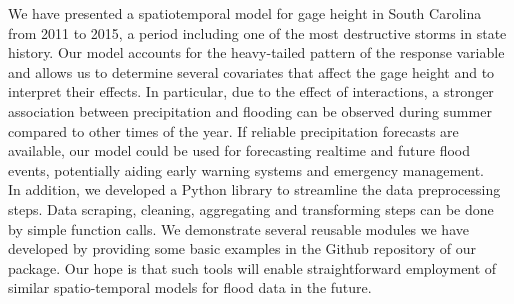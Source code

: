 
We have presented a spatiotemporal model for gage height in South Carolina from 2011 to 2015, a period including one of the most destructive storms in state history.
Our model accounts for the heavy-tailed pattern of the response variable and allows us to determine several covariates that affect the gage height and to interpret their effects.
In particular, due to the effect of interactions, a stronger association between precipitation and flooding can be observed during summer compared to other times of the year.
If reliable precipitation forecasts are available, our model could be used for forecasting realtime and future flood events, potentially aiding early warning systems and emergency management.\\

In addition, we developed a Python library to streamline the data preprocessing steps.
Data scraping,  cleaning, aggregating and transforming steps can be done by simple function calls.
We demonstrate several reusable modules we have developed  by providing some basic examples in the Github repository of our package.
Our hope is that such tools will enable straightforward employment of similar spatio-temporal models for flood data in the future.
